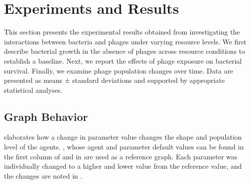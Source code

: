 \chapter{Experiments and Results}
\label{AER}
This section presents the experimental results obtained from investigating the interactions between bacteria and phages under varying resource levels. 
We first describe bacterial growth in the absence of phages across resource conditions to establish a baseline. 
Next, we report the effects of phage exposure on bacterial survival. 
Finally, we examine phage population changes over time. 
Data are presented as means ± standard deviations and supported by appropriate statistical analyses.

\section{Graph Behavior}
 elaborates how a change in parameter value changes the shape and population level of the agents. 
, whose agent and parameter default values can be found in the first column of  and in  are used as a reference graph. 
Each parameter was individually changed to a higher and lower value from the reference value, and the changes are noted in . 

